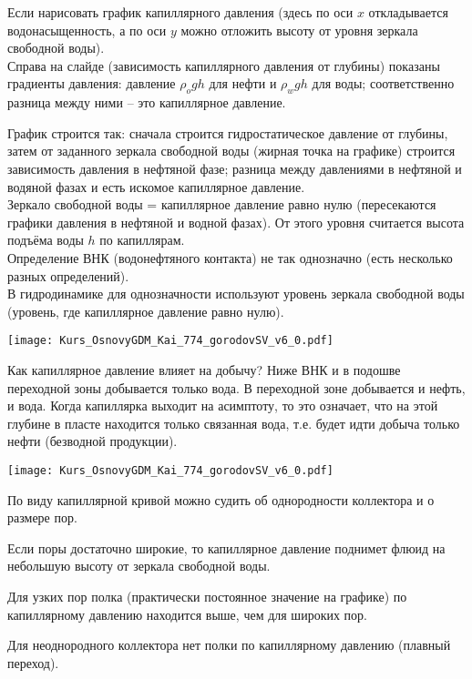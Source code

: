 Если нарисовать график капиллярного давления (здесь по оси $x$ откладывается водонасыщенность, а по оси $y$ можно отложить высоту от уровня зеркала свободной воды).
\\

Справа на слайде (зависимость капиллярного давления от глубины) показаны градиенты давления: давление $\rho_{o} g h$ для нефти и $\rho_{w} g h$ для воды; соответственно разница между ними -- это капиллярное давление.

График строится так: сначала строится гидростатическое давление от глубины, затем от заданного зеркала свободной воды (жирная точка на графике) строится зависимость давления в нефтяной фазе; разница между давлениями в нефтяной и водяной фазах и есть искомое капиллярное давление.
\\

Зеркало свободной воды = капиллярное давление равно нулю (пересекаются графики давления в нефтяной и водной фазах).
От этого уровня считается высота подъёма воды $h$ по капиллярам.
\\

Определение ВНК (водонефтяного контакта) не так однозначно (есть несколько разных определений).
\\

В гидродинамике для однозначности используют уровень зеркала свободной воды (уровень, где капиллярное давление равно нулю).

\texttt{[image: Kurs\_OsnovyGDM\_Kai\_774\_gorodovSV\_v6\_0.pdf]}

Как капиллярное давление влияет на добычу?
Ниже ВНК и в подошве переходной зоны добывается только вода.
В переходной зоне добывается и нефть, и вода.
Когда капиллярка выходит на асимптоту, то это означает, что на этой глубине в пласте находится только связанная вода, т.е. будет идти добыча только нефти (безводной продукции).

\texttt{[image: Kurs\_OsnovyGDM\_Kai\_774\_gorodovSV\_v6\_0.pdf]}

По виду капиллярной кривой можно судить об однородности коллектора и о размере пор.

Если поры достаточно широкие, то капиллярное давление поднимет флюид на небольшую высоту от зеркала свободной воды.

Для узких пор полка (практически постоянное значение на графике) по капиллярному давлению находится выше, чем для широких пор.

Для неоднородного коллектора нет полки по капиллярному давлению (плавный переход).


